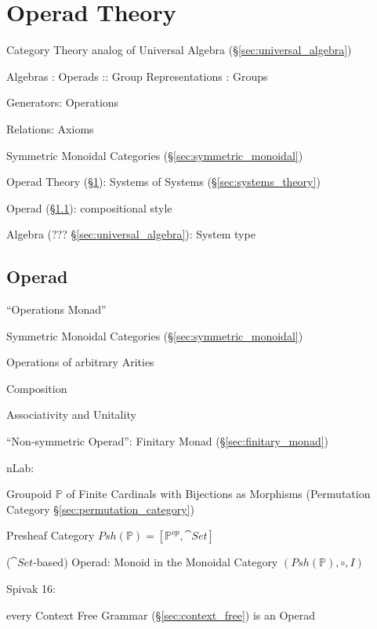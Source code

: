 \section{Operad Theory}\label{sec:operad_theory}

Category Theory analog of Universal Algebra
(\S\ref{sec:universal_algebra})

Algebras : Operads :: Group Representations : Groups

Generators: Operations

Relations: Axioms

Symmetric Monoidal Categories
(\S\ref{sec:symmetric_monoidal})

Operad Theory (\S\ref{sec:operad_theory}): Systems of Systems
(\S\ref{sec:systems_theory})

Operad (\S\ref{sec:operad}): compositional style

Algebra (??? \S\ref{sec:universal_algebra}): System type



\subsection{Operad}\label{sec:operad}

``Operations Monad''

Symmetric Monoidal Categories
(\S\ref{sec:symmetric_monoidal})

Operations of arbitrary Arities

Composition

Associativity and Unitality

``Non-symmetric Operad'': Finitary Monad (\S\ref{sec:finitary_monad})

nLab:

Groupoid $\mathbb{P}$ of Finite Cardinals with Bijections as Morphisms
(Permutation Category \S\ref{sec:permutation_category})

Presheaf Category $Psh(\mathbb{P}) = [\mathbb{P}^{op}, \cat{Set}]$

($\cat{Set}$-based) Operad: Monoid in the Monoidal Category
$(Psh(\mathbb{P}), \circ, I)$ %

Spivak 16:

every Context Free Grammar (\S\ref{sec:context_free}) is an Operad

